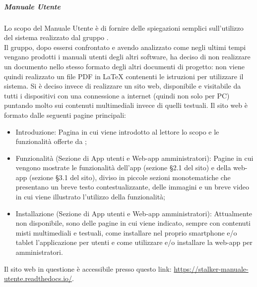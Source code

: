 \subparagraph*{Manuale Utente}
Lo scopo del Manuale Utente è di fornire delle spiegazioni semplici sull'utilizzo del sistema \NomeProgetto{} realizzato dal gruppo \Gruppo{}.\\
Il gruppo, dopo essersi confrontato e avendo analizzato come negli ultimi tempi vengano prodotti i manuali utenti degli altri software, ha deciso di non realizzare un documento nello stesso formato degli altri documenti di progetto: non viene quindi realizzato un file PDF in \LaTeX{} contenenti le istruzioni per utilizzare il sistema.
Si è deciso invece di realizzare un sito web, disponibile e visitabile da tutti i dispositivi con una connessione a internet (quindi non solo per PC) puntando molto sui contenuti multimediali invece di quelli testuali.
Il sito web è formato dalle seguenti pagine principali:
\begin{itemize}
    \item Introduzione: Pagina in cui viene introdotto al lettore lo scopo e le funzionalità offerte da \NomeProgetto{};
    \item Funzionalità (Sezione di App utenti e Web-app amministratori): Pagine in cui vengono mostrate le funzionalità dell'app (sezione §2.1 del sito) e della web-app (sezione §3.1 del sito), diviso in piccole sezioni monotematiche che presentano un breve testo contestualizzante, delle immagini e un breve video in cui viene illustrato l'utilizzo della funzionalità;
    \item Installazione (Sezione di App utenti e Web-app amministratori): Attualmente non disponibile, sono delle pagine in cui viene indicato, sempre con contenuti misti multimediali e testuali, come installare nel proprio smartphone e/o tablet l'applicazione per utenti e come utilizzare e/o installare la web-app per amministratori.
\end{itemize}

Il sito web in questione è accessibile presso questo link: \href{https://stalker-manuale-utente.readthedocs.io/}{https://stalker-manuale-utente.readthedocs.io/}.

